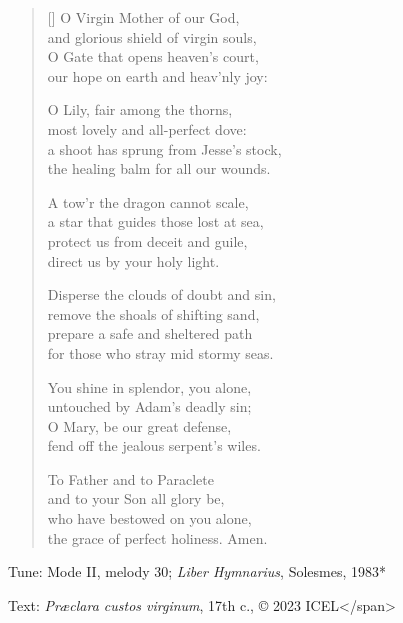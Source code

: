 \hymn

\settowidth{\versewidth}{a shoot has sprung from Jesse’s stock,}

\begin{verse}[\versewidth]
O Virgin Mother of our God,\\
and glorious shield of virgin souls,\\
O Gate that opens heaven’s court,\\
our hope on earth and heav’nly joy:

O Lily, fair among the thorns,\\
most lovely and all-perfect dove:\\
a shoot has sprung from Jesse’s stock,\\
the healing balm for all our wounds.

A tow’r the dragon cannot scale,\\
a star that guides those lost at sea,\\
protect us from deceit and guile,\\
direct us by your holy light.

Disperse the clouds of doubt and sin,\\
remove the shoals of shifting sand,\\
prepare a safe and sheltered path\\
for those who stray mid stormy seas.

You shine in splendor, you alone,\\
untouched by Adam’s deadly sin;\\
O Mary, be our great defense,\\
fend off the jealous serpent’s wiles.

To Father and to Paraclete\\
and to your Son all glory be,\\
who have bestowed on you alone,\\
the grace of perfect holiness. Amen.
\end{verse}

\begin{hymnsource}
Tune: Mode II, melody 30; \emph{Liber Hymnarius}, Solesmes, 1983*

Text: \emph{Præclara custos virginum}, 17th c., © 2023 ICEL</span>

 


\end{hymnsource}